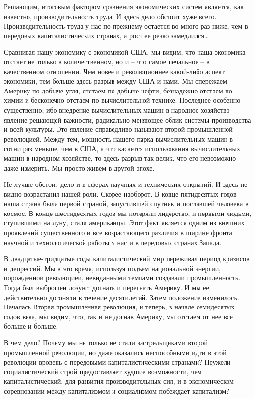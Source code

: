 \documentclass{book}
\begin{document}
Решающим, итоговым фактором сравнения экономических систем является, как известно, производительность труда. И здесь дело 
обстоит хуже всего. Производительность труда у нас по-прежнему остается во много раз ниже, чем в передовых ка­питалистических 
странах, а рост ее резко замедлился\ldots

Сравнивая нашу экономику с экономикой США, мы видим, что наша экономика отстает не только в количественном, но и -- что самое 
печальное -- в качественном отношении. Чем новее и революционнее какой-либо аспект экономики, тем больше здесь разрыв между США и 
нами. Мы опережаем Америку по добыче угля, отстаем по добыче нефти, безнадежно отстаем по химии и бесконечно отстаем по 
вычислительной технике. Пос­леднее особенно существенно, ибо внедрение вычислительных машин в народное хозяйство -- явление 
решающей важности, радикально меняющее облик системы производства и всей культуры. Это явление справедливо называют второй 
промышленной революцией. Между тем, мощность нашего парка вычислительных машин в сотни раз  меньше, чем в США, а что касается 
использования вычислительных машин в народном хозяйстве, то здесь разрыв так велик, что его невозможно даже измерить. Мы просто 
живем в другой эпохе.

Не лучше обстоит дело и в сферах научных и технических открытий. И здесь не видно возрастания нашей роли. Скорее наоборот. В 
конце пятидесятых годов наша страна была первой страной, запустившей спутник и пославшей человека в кос­мос. В конце шестидесятых 
годов мы потеряли лидерство, и первыми людьми, ступившими на луну, стали американцы. Этот факт является одним из внешних 
проявлений существен­ного и все возрастающего различия в ширине фронта научной и технологической работы у нас и в передовых 
странах Запада.

В двадцатые-тридцатые годы капиталистический мир переживал период кризисов и депрессий. Мы в это время, исполь­зуя подъем 
национальной энергии, порожденной революцией, невиданными темпами создавали промышленность. Тогда был выброшен лозунг: догнать и 
перегнать Америку. И мы ее действительно догоняли в течение десятилетий. Затем положение изменилось. Началась Вторая 
промышленная революция, и те­перь, в начале семидесятых годов века, мы видим, что, так и не догнав Америку, мы отстаем от нее все 
больше и больше.

В чем дело? Почему мы не только не стали застрельщиками второй промышленной революции, но даже оказались неспособ­ными идти в 
этой революции вровень с передовыми капиталистическими странами? Неужели социалистический строй предоставляет худшие 
возможности, чем капиталистический, для развития производительных сил, и в экономическом соревновании между капитализмом и 
социализмом побеждает капитализм?
\end{document}
